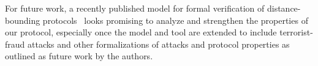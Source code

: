 For future work, a recently published model for formal verification
of distance-bounding protocols~\cite{TamarinDB} looks promising to
analyze and strengthen the properties of our protocol, especially once
the model and tool are extended to include terrorist-fraud attacks and
other formalizations of attacks and protocol properties as outlined as
future work by the authors.


